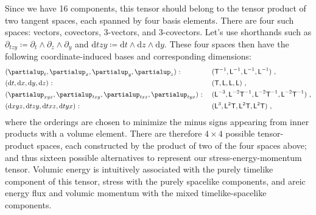 \documentclass[\ifafour a4paper,12pt,\else a5paper,10pt,\fi%
onecolumn,oneside,article,%
british%
]{memoir}
\theoremstyle{remark}
\theoremstyle{innote}
\newcommand*{\de}{\partialup}%
\newcommand*{\di}{\mathrm{d}}%
\newcommand*{\defd}{\coloneqq}
\renewcommand*{\|}[1][]{\nonscript\,#1\vert\nonscript\;\mathopen{}}
\newcommand*{\Le}{\textsf{L}}
\newcommand*{\Ti}{\textsf{T}}
\newcommand*{\dexyz}{\de_{xyz}}
\newcommand*{\detzy}{\de_{tzy}}
\newcommand*{\detxz}{\de_{txz}}
\newcommand*{\detyx}{\de_{tyx}}
\newcommand*{\dixyz}{\di xyz}
\newcommand*{\ditzy}{\di tzy}
\newcommand*{\ditxz}{\di txz}
\newcommand*{\dityx}{\di tyx}
\begin{document}
Since we have 16 components, this tensor should belong to the tensor
product of two tangent spaces, each spanned by four basis elements. There
are four such spaces: vectors, covectors, 3-vectors, and 3-covectors. Let's
use shorthands such as
$\detzy \defd \de_{t} \land \de_{z} \land \de_{y}$ and
$\ditzy \defd \di t \land \di z \land \di y$. These four spaces then have
the following coordinate-induced bases and corresponding dimensions:
\begin{subequations}\label{eq:bases}
  \begin{align}
    \label{eq:base_vec}
    &  (\de_{t}, \de_{x}, \de_{y}, \de_{z})\ \text{:}
    &&\text{\small }\ (\Ti^{-1}, \Le^{-1}, \Le^{-1}, \Le^{-1}) \ ,
    \\
    \label{eq:base_covec}
    &  (\di t, \di x, \di y, \di z) \ \text{:}
    &&\text{\small }\ (\Ti, \Le, \Le, \Le) \ ,
    \\
    \label{eq:base_trivec}
    &  (\dexyz, \detzy, \detxz, \detyx)\ \text{:}
    &&\text{\small }\  (\Le^{-3}, \Le^{-2}\Ti^{-1}, \Le^{-2}\Ti^{-1}, \Le^{-2}\Ti^{-1}) \ ,
    \\
    \label{eq:base_tricovec}
    &  (\dixyz, \ditzy, \ditxz, \dityx)\ \text{:}
    &&\text{\small }\  (\Le^{3}, \Le^{2}\Ti, \Le^{2}\Ti, \Le^{2}\Ti) \ ,
  \end{align}
\end{subequations}
where the orderings are chosen to minimize the minus signs appearing from
inner products with a volume element. There are therefore $4 \times 4$
possible tensor-product spaces, each constructed by the product of two of
the four spaces above; %
and thus sixteen possible alternatives to represent our
stress-energy-momentum tensor. Volumic energy is intuitively associated
with the purely timelike component of this tensor, stress with the purely
spacelike components, and areic energy flux and volumic momentum with the
mixed timelike-spacelike components.
\end{document}
